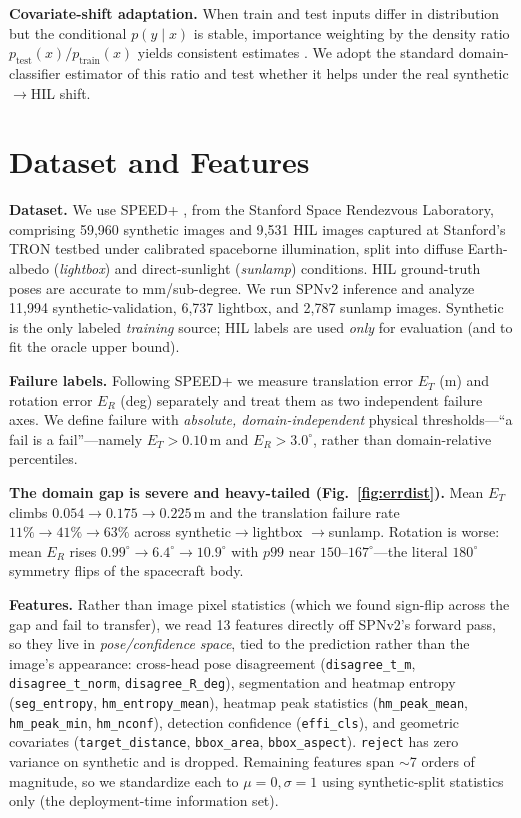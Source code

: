\documentclass{article}
\newcommand{\ET}{E_T}
\newcommand{\ER}{E_R}
\begin{document}
\textbf{Covariate-shift adaptation.} When train and test inputs differ in
distribution but the conditional $p(y\mid x)$ is stable, importance weighting by
the density ratio $p_\text{test}(x)/p_\text{train}(x)$ yields consistent estimates
\citep{shimodaira_2000, sugiyama_2007}. We adopt the standard
domain-classifier estimator of this ratio and test whether it helps under the real
synthetic$\rightarrow$HIL shift.

\section{Dataset and Features}

\textbf{Dataset.} We use SPEED+ \citep{park_speed_2022}, from the Stanford Space
Rendezvous Laboratory, comprising 59{,}960 synthetic images and 9{,}531 HIL images
captured at Stanford's TRON testbed under calibrated spaceborne illumination, split
into diffuse Earth-albedo (\emph{lightbox}) and direct-sunlight (\emph{sunlamp})
conditions. HIL ground-truth poses are accurate to mm/sub-degree. We run SPNv2
inference and analyze 11{,}994 synthetic-validation, 6{,}737 lightbox, and 2{,}787
sunlamp images. Synthetic is the only labeled \emph{training} source; HIL labels are
used \emph{only} for evaluation (and to fit the oracle upper bound).

\textbf{Failure labels.} Following SPEED+ we measure translation error $\ET$ (m) and
rotation error $\ER$ (deg) separately and treat them as two independent failure
axes. We define failure with \emph{absolute, domain-independent} physical
thresholds---``a fail is a fail''---namely $\ET>0.10$\,m and $\ER>3.0^\circ$, rather
than domain-relative percentiles.

\textbf{The domain gap is severe and heavy-tailed (Fig.~\ref{fig:errdist}).} Mean
$\ET$ climbs $0.054\rightarrow0.175\rightarrow0.225$\,m and the translation failure
rate $11\%\rightarrow41\%\rightarrow63\%$ across synthetic$\rightarrow$lightbox
$\rightarrow$sunlamp. Rotation is worse: mean $\ER$ rises
$0.99^\circ\rightarrow6.4^\circ\rightarrow10.9^\circ$ with $p99$ near
$150$--$167^\circ$---the literal $180^\circ$ symmetry flips of the spacecraft body.

\textbf{Features.} Rather than image pixel statistics (which we found sign-flip
across the gap and fail to transfer), we read 13 features directly off SPNv2's
forward pass, so they live in \emph{pose/confidence space}, tied to the prediction
rather than the image's appearance: cross-head pose disagreement
(\texttt{disagree\_t\_m}, \texttt{disagree\_t\_norm}, \texttt{disagree\_R\_deg}),
segmentation and heatmap entropy (\texttt{seg\_entropy},
\texttt{hm\_entropy\_mean}), heatmap peak statistics (\texttt{hm\_peak\_mean},
\texttt{hm\_peak\_min}, \texttt{hm\_nconf}), detection confidence
(\texttt{effi\_cls}), and geometric covariates (\texttt{target\_distance},
\texttt{bbox\_area}, \texttt{bbox\_aspect}). \texttt{reject} has zero variance on
synthetic and is dropped. Remaining features span $\sim$7 orders of magnitude, so we
standardize each to $\mu{=}0,\sigma{=}1$ using synthetic-split statistics only (the
deployment-time information set).
\end{document}
